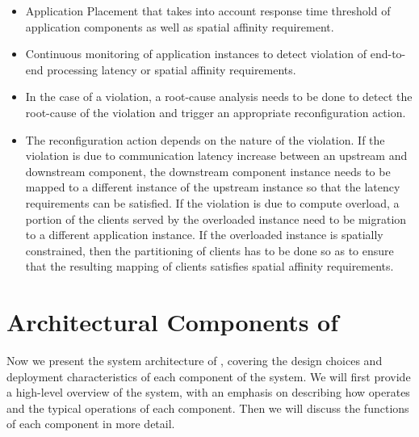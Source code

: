 \begin{itemize}
\item Application Placement that takes into account response time threshold of application components as well as spatial affinity requirement.
\item Continuous monitoring of application instances to detect violation of end-to-end processing latency or spatial affinity requirements.
\item In the case of a violation, a root-cause analysis needs to be done to detect the root-cause of the violation and trigger an appropriate reconfiguration action.
\item The reconfiguration action depends on the nature of the violation. If the violation is due to communication latency increase between an upstream and downstream component, the downstream component instance needs to be mapped to a different instance of the upstream instance so that the latency requirements can be satisfied. If the violation is due to compute overload, a portion of the clients served by the overloaded instance need to be migration to a different application instance. If the overloaded instance is spatially constrained, then the partitioning of clients has to be done so as to ensure that the resulting mapping of clients satisfies spatial affinity requirements.
\end{itemize}

\section{Architectural Components of \oneedge{}}
\label{sec:oneedge_arch}
Now we present the system architecture of \oneedge{}, covering the design choices and deployment characteristics of each component of the system. We will first provide a high-level overview of the system, with an emphasis on describing how \oneedge{} operates and the typical operations of each component. Then we will discuss the functions of each component in more detail.

